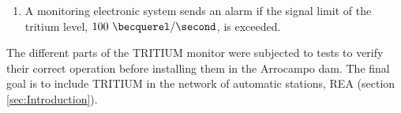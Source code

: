 \begin{enumerate}
\item{} A monitoring electronic system sends an alarm if the signal limit of the tritium level, $100~\becquerel/\second$, is exceeded.

\end{enumerate}

The different parts of the TRITIUM monitor were subjected to tests to verify their correct operation before installing them in the Arrocampo dam. The final goal is to include TRITIUM in the network of automatic stations, REA (section \ref{sec:Introduction}).